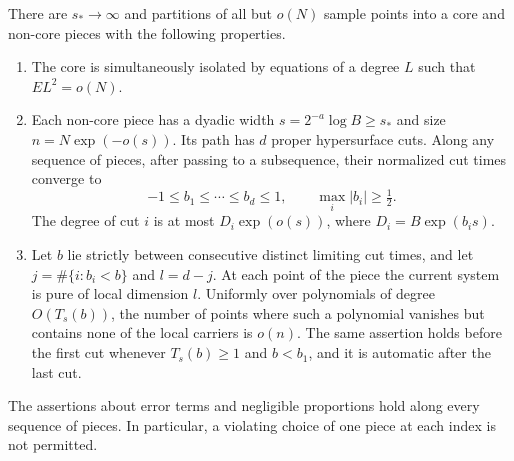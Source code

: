 \begin{proposition}\label{prof:partition}
There are $s_*\to\infty$ and partitions of all but $o(N)$ sample points
into a core and non-core pieces with the following properties.
\begin{enumerate}
\item The core is simultaneously isolated by equations of a degree $L$
such that $EL^2=o(N)$.
\item Each non-core piece has a dyadic width
$s=2^{-a}\log B\ge s_*$ and size $n=N\exp(-o(s))$.  Its path has $d$
proper hypersurface cuts.  Along any sequence of pieces, after passing
to a subsequence, their normalized cut times converge to
\[
 -1\le b_1\le\cdots\le b_d\le1,\qquad
 \max_i|b_i|\ge\tfrac12.
\]
The degree of cut $i$ is at most
$D_i\exp(o(s))$, where $D_i=B\exp(b_i s)$.
\item Let $b$ lie strictly between consecutive distinct limiting cut
times, and let $j=\#\{i:b_i<b\}$ and $l=d-j$.  At each point of the
piece the current system is pure of local dimension $l$.  Uniformly
over polynomials of degree $O(T_s(b))$, the number of points where such
a polynomial vanishes but contains none of the local carriers is
$o(n)$.  The same assertion holds before the first cut whenever
$T_s(b)\ge1$ and $b<b_1$, and it is automatic after the last cut.
\end{enumerate}
The assertions about error terms and negligible proportions hold along
every sequence of pieces.  In particular, a violating choice of one
piece at each index is not permitted.
\end{proposition}

